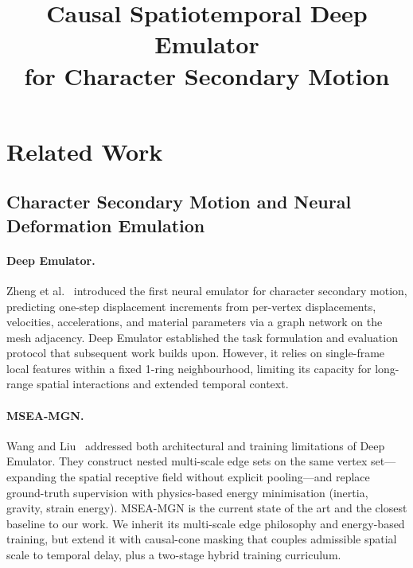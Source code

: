 \documentclass[10pt,twocolumn]{article}
\title{Causal Spatiotemporal Deep Emulator\\for Character Secondary Motion}
\author{}
\date{}
\begin{document}
\section{Related Work}
\label{sec:related}

\subsection{Character Secondary Motion and Neural Deformation Emulation}

\paragraph{Deep Emulator.}
Zheng et al.~\cite{zheng2021deep} introduced the first neural emulator for character secondary motion, predicting one-step displacement increments from per-vertex displacements, velocities, accelerations, and material parameters via a graph network on the mesh adjacency. Deep Emulator established the task formulation and evaluation protocol that subsequent work builds upon. However, it relies on single-frame local features within a fixed 1-ring neighbourhood, limiting its capacity for long-range spatial interactions and extended temporal context.

\paragraph{MSEA-MGN.}
Wang and Liu~\cite{wang2024msea} addressed both architectural and training limitations of Deep Emulator. They construct nested multi-scale edge sets on the same vertex set---expanding the spatial receptive field without explicit pooling---and replace ground-truth supervision with physics-based energy minimisation (inertia, gravity, strain energy). MSEA-MGN is the current state of the art and the closest baseline to our work. We inherit its multi-scale edge philosophy and energy-based training, but extend it with causal-cone masking that couples admissible spatial scale to temporal delay, plus a two-stage hybrid training curriculum.
\end{document}
